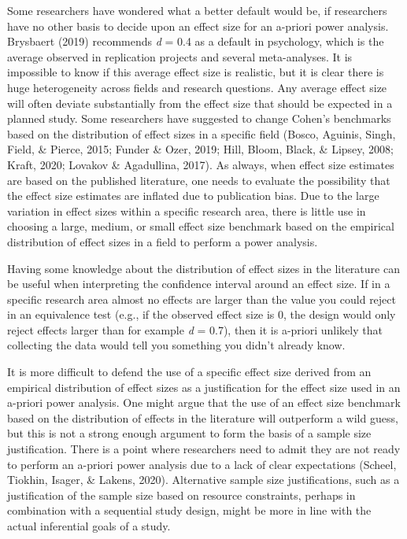 \documentclass[
  english,
  ,jou,floatsintext]{apa6}
\begin{document}
Some researchers have wondered what a better default would be, if researchers have no other basis to decide upon an effect size for an a-priori power analysis. Brysbaert (2019) recommends \emph{d} = 0.4 as a default in psychology, which is the average observed in replication projects and several meta-analyses. It is impossible to know if this average effect size is realistic, but it is clear there is huge heterogeneity across fields and research questions. Any average effect size will often deviate substantially from the effect size that should be expected in a planned study. Some researchers have suggested to change Cohen's benchmarks based on the distribution of effect sizes in a specific field (Bosco, Aguinis, Singh, Field, \& Pierce, 2015; Funder \& Ozer, 2019; Hill, Bloom, Black, \& Lipsey, 2008; Kraft, 2020; Lovakov \& Agadullina, 2017). As always, when effect size estimates are based on the published literature, one needs to evaluate the possibility that the effect size estimates are inflated due to publication bias. Due to the large variation in effect sizes within a specific research area, there is little use in choosing a large, medium, or small effect size benchmark based on the empirical distribution of effect sizes in a field to perform a power analysis.

Having some knowledge about the distribution of effect sizes in the literature can be useful when interpreting the confidence interval around an effect size. If in a specific research area almost no effects are larger than the value you could reject in an equivalence test (e.g., if the observed effect size is 0, the design would only reject effects larger than for example \emph{d} = 0.7), then it is a-priori unlikely that collecting the data would tell you something you didn't already know.

It is more difficult to defend the use of a specific effect size derived from an empirical distribution of effect sizes as a justification for the effect size used in an a-priori power analysis. One might argue that the use of an effect size benchmark based on the distribution of effects in the literature will outperform a wild guess, but this is not a strong enough argument to form the basis of a sample size justification. There is a point where researchers need to admit they are not ready to perform an a-priori power analysis due to a lack of clear expectations (Scheel, Tiokhin, Isager, \& Lakens, 2020). Alternative sample size justifications, such as a justification of the sample size based on resource constraints, perhaps in combination with a sequential study design, might be more in line with the actual inferential goals of a study.
\end{document}
